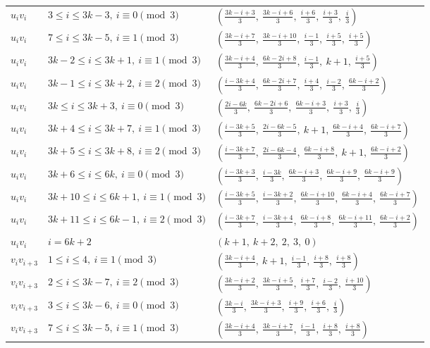\begin{longtable}{lll}
$u_i v_i$ & $3 \le i \le 3k-3,\ i \equiv 0 \pmod{3}$ & $(\frac{3k-i+3}{3},\ \frac{3k-i+6}{3},\ \frac{i+6}{3},\ \frac{i+3}{3},\ \frac{i}{3})$ \\
$u_i v_i$ & $7 \le i \le 3k-5,\ i \equiv 1 \pmod{3}$ & $(\frac{3k-i+7}{3},\ \frac{3k-i+10}{3},\ \frac{i-1}{3},\ \frac{i+5}{3},\ \frac{i+5}{3})$ \\
$u_i v_i$ & $3k-2 \le i \le 3k+1,\ i \equiv 1 \pmod{3}$ & $(\frac{3k-i+4}{3},\ \frac{6k-2i+8}{3},\ \frac{i-1}{3},\ k+1,\ \frac{i+5}{3})$ \\
$u_i v_i$ & $3k-1 \le i \le 3k+2,\ i \equiv 2 \pmod{3}$ & $(\frac{i-3k+4}{3},\ \frac{6k-2i+7}{3},\ \frac{i+4}{3},\ \frac{i-2}{3},\ \frac{6k-i+2}{3})$ \\
$u_i v_i$ & $3k \le i \le 3k+3,\ i \equiv 0 \pmod{3}$ & $(\frac{2i-6k}{3},\ \frac{6k-2i+6}{3},\ \frac{6k-i+3}{3},\ \frac{i+3}{3},\ \frac{i}{3})$ \\
$u_i v_i$ & $3k+4 \le i \le 3k+7,\ i \equiv 1 \pmod{3}$ & $(\frac{i-3k+5}{3},\ \frac{2i-6k-5}{3},\ k+1,\ \frac{6k-i+4}{3},\ \frac{6k-i+7}{3})$ \\
$u_i v_i$ & $3k+5 \le i \le 3k+8,\ i \equiv 2 \pmod{3}$ & $(\frac{i-3k+7}{3},\ \frac{2i-6k-4}{3},\ \frac{6k-i+8}{3},\ k+1,\ \frac{6k-i+2}{3})$ \\
$u_i v_i$ & $3k+6 \le i \le 6k,\ i \equiv 0 \pmod{3}$ & $(\frac{i-3k+3}{3},\ \frac{i-3k}{3},\ \frac{6k-i+3}{3},\ \frac{6k-i+9}{3},\ \frac{6k-i+9}{3})$ \\
$u_i v_i$ & $3k+10 \le i \le 6k+1,\ i \equiv 1 \pmod{3}$ & $(\frac{i-3k+5}{3},\ \frac{i-3k+2}{3},\ \frac{6k-i+10}{3},\ \frac{6k-i+4}{3},\ \frac{6k-i+7}{3})$ \\
$u_i v_i$ & $3k+11 \le i \le 6k-1,\ i \equiv 2 \pmod{3}$ & $(\frac{i-3k+7}{3},\ \frac{i-3k+4}{3},\ \frac{6k-i+8}{3},\ \frac{6k-i+11}{3},\ \frac{6k-i+2}{3})$ \\
$u_i v_i$ & $i = 6k+2$ & $(k+1,\ k+2,\ 2,\ 3,\ 0)$ \\
$v_i v_{i+3}$ & $1 \le i \le 4,\ i \equiv 1 \pmod{3}$ & $(\frac{3k-i+4}{3},\ k+1,\ \frac{i-1}{3},\ \frac{i+8}{3},\ \frac{i+8}{3})$ \\
$v_i v_{i+3}$ & $2 \le i \le 3k-7,\ i \equiv 2 \pmod{3}$ & $(\frac{3k-i+2}{3},\ \frac{3k-i+5}{3},\ \frac{i+7}{3},\ \frac{i-2}{3},\ \frac{i+10}{3})$ \\
$v_i v_{i+3}$ & $3 \le i \le 3k-6,\ i \equiv 0 \pmod{3}$ & $(\frac{3k-i}{3},\ \frac{3k-i+3}{3},\ \frac{i+9}{3},\ \frac{i+6}{3},\ \frac{i}{3})$ \\
$v_i v_{i+3}$ & $7 \le i \le 3k-5,\ i \equiv 1 \pmod{3}$ & $(\frac{3k-i+4}{3},\ \frac{3k-i+7}{3},\ \frac{i-1}{3},\ \frac{i+8}{3},\ \frac{i+8}{3})$ \\

\end{longtable}
